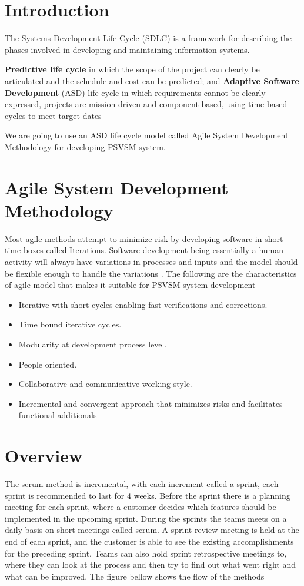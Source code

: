 \documentclass[a4paper, 12pt]{report}
\begin{document}
\section{Introduction}
\noindent The Systems Development Life Cycle (SDLC) is a framework for describing the phases involved
in developing and maintaining information systems.\par 
\noindent \textbf{Predictive life cycle} in which the scope of the project can clearly be articulated and the schedule
and cost can be predicted; and \textbf{ Adaptive Software Development} (ASD) life cycle in which
requirements cannot be clearly expressed, projects are mission driven and component based,
using time-based cycles to meet target dates \par 
\noindent We are going to use an ASD life cycle model called Agile System Development Methodology
for developing PSVSM system.

\section{Agile System Development Methodology}
\noindent Most agile methods attempt to minimize risk by developing software in short time boxes called
Iterations. Software development being essentially a human activity will always have variations
in processes and inputs and the model should be flexible enough to handle the variations \cite{schwaber2002}. The
following are the characteristics of agile model that makes it suitable for PSVSM system development
\begin{itemize}
\item Iterative with short cycles enabling fast verifications and corrections.
\item Time bound iterative cycles.
\item Modularity at development process level.
\item People oriented.
\item Collaborative and communicative working style.
\item Incremental and convergent approach that minimizes risks and facilitates functional additionals
\end{itemize}
\section{Overview}
\noindent The scrum method is incremental, with each increment called a sprint, each sprint is
recommended to last for 4 weeks. Before the sprint there is a planning meeting for each sprint,
where a customer decides which features should be implemented in the upcoming sprint. During
the sprints the teams meets on a daily basis on short meetings called scrum. A sprint review
meeting is held at the end of each sprint, and the customer is able to see the existing
accomplishments for the preceding sprint. Teams can also hold sprint retrospective meetings to,
where they can look at the process and then try to find out what went right and what can be
improved. The figure bellow shows the flow of the methods
\end{document}

